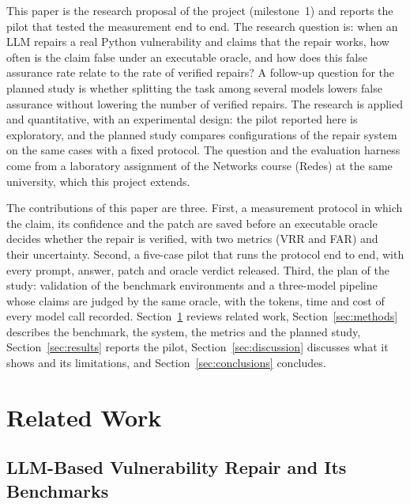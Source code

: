 \documentclass[ai,article,submit,oneauthor]{Definitions/mdpi}
\begin{document}
This paper is the research proposal of the project (milestone~1) and reports the pilot that tested the measurement end to end. The research question is: when an LLM repairs a real Python vulnerability and claims that the repair works, how often is the claim false under an executable oracle, and how does this false assurance rate relate to the rate of verified repairs? A follow-up question for the planned study is whether splitting the task among several models lowers false assurance without lowering the number of verified repairs. The research is applied and quantitative, with an experimental design: the pilot reported here is exploratory, and the planned study compares configurations of the repair system on the same cases with a fixed protocol. The question and the evaluation harness come from a laboratory assignment of the Networks course (Redes) at the same university, which this project extends.

The contributions of this paper are three. First, a measurement protocol in which the claim, its confidence and the patch are saved before an executable oracle decides whether the repair is verified, with two metrics (VRR and FAR) and their uncertainty. Second, a five-case pilot that runs the protocol end to end, with every prompt, answer, patch and oracle verdict released. Third, the plan of the study: validation of the benchmark environments and a three-model pipeline whose claims are judged by the same oracle, with the tokens, time and cost of every model call recorded. Section~\ref{sec:related} reviews related work, Section~\ref{sec:methods} describes the benchmark, the system, the metrics and the planned study, Section~\ref{sec:results} reports the pilot, Section~\ref{sec:discussion} discusses what it shows and its limitations, and Section~\ref{sec:conclusions} concludes.

\section{Related Work}\label{sec:related}

\subsection{LLM-Based Vulnerability Repair and Its Benchmarks}
\end{document}

